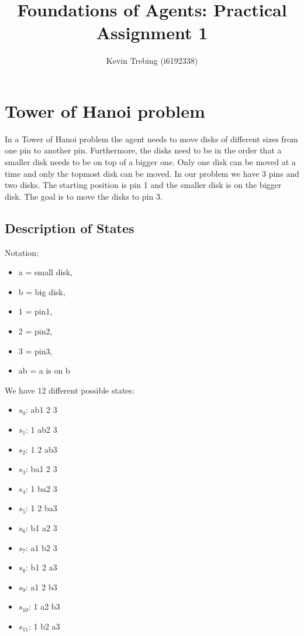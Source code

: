 \documentclass[a4paper]{article}
\title{Foundations of Agents: Practical Assignment 1}
\author{Kevin Trebing (i6192338)}
\begin{document}
\maketitle

\section{Tower of Hanoi problem}
In a Tower of Hanoi problem the agent needs to move disks of different sizes from one pin to another pin. Furthermore, the disks need to be in the order that a smaller disk needs to be on top of a bigger one. Only one disk can be moved at a time and only the topmost disk can be moved. In our problem we have 3 pins and two disks. The starting position is pin 1 and the smaller disk is on the bigger disk. The goal is to move the disks to pin 3.

\subsection{Description of States}
Notation: 
\begin{multicols}{2}
\begin{itemize}

\item a = small disk, 
\item b = big disk,  
\item 1 = pin1, 
\item 2 = pin2, 
\item 3 = pin3, 
\item ab = a is on b
\end{itemize}
\end{multicols}

\noindent
We have 12 different possible states: 
\begin{multicols}{2}
\begin{itemize}
\item $s_{0}$: ab1 2 3
\item $s_{1}$: 1 ab2 3
\item $s_{2}$: 1 2 ab3
\item $s_{3}$: ba1 2 3
\item $s_{4}$: 1 ba2 3
\item $s_{5}$: 1 2 ba3
\item $s_{6}$: b1 a2 3
\item $s_{7}$: a1 b2 3
\item $s_{8}$: b1 2 a3
\item $s_{9}$: a1 2 b3
\item $s_{10}$: 1 a2 b3
\item $s_{11}$: 1 b2 a3
\end{itemize}
\end{multicols}
\end{document}
